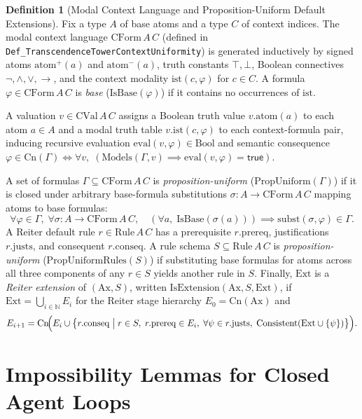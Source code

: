 \documentclass[11pt]{article}
\theoremstyle{plain}
\theoremstyle{definition}
\newtheorem{definition}[theorem]{Definition}
\theoremstyle{remark}
\newcommand{\ist}{\mathrm{ist}}
\newcommand{\Cn}{\mathrm{Cn}}
\newcommand{\eval}{\mathrm{eval}}
\newcommand{\Ax}{\mathrm{Ax}}
\newcommand{\Ext}{\mathrm{Ext}}
\newcommand{\CForm}{\mathrm{CForm}}
\newcommand{\CVal}{\mathrm{CVal}}
\newcommand{\Rule}{\mathrm{Rule}}
\newcommand{\IsBase}{\mathrm{IsBase}}
\newcommand{\PropUniform}{\mathrm{PropUniform}}
\newcommand{\PropUniformRules}{\mathrm{PropUniformRules}}
\newcommand{\IsExtension}{\mathrm{IsExtension}}
\newcommand{\Consistent}{\mathrm{Consistent}}
\newcommand{\Models}{\mathrm{Models}}
\begin{document}
\begin{definition}[Modal Context Language and Proposition-Uniform Default Extensions]
Fix a type $A$ of base atoms and a type $C$ of context indices. The modal
context language $\CForm\,A\,C$ (defined in
\texttt{Def\_TranscendenceTowerContextUniformity}) is generated inductively by
signed atoms $\mathrm{atom}^+(a)$ and $\mathrm{atom}^-(a)$, truth constants
$\top, \bot$, Boolean connectives $\neg, \wedge, \vee, \to$, and the context
modality $\ist(c, \varphi)$ for $c \in C$. A formula $\varphi \in \CForm\,A\,C$
is \emph{base} ($\IsBase(\varphi)$) if it contains no occurrences of $\ist$.

A valuation $v \in \CVal\,A\,C$ assigns a Boolean truth value $v.\mathrm{atom}(a)$
to each atom $a \in A$ and a modal truth table $v.\mathrm{ist}(c, \varphi)$ to
each context-formula pair, inducing recursive evaluation $\eval(v, \varphi) \in
\mathrm{Bool}$ and semantic consequence $\varphi \in \Cn(\Gamma) \iff
\forall v,\; (\Models(\Gamma, v) \implies \eval(v, \varphi) = \mathsf{true})$.

A set of formulas $\Gamma \subseteq \CForm\,A\,C$ is \emph{proposition-uniform}
($\PropUniform(\Gamma)$) if it is closed under arbitrary base-formula
substitutions $\sigma : A \to \CForm\,A\,C$ mapping atoms to base formulas:
\[
  \forall \varphi \in \Gamma,\;\forall \sigma : A \to \CForm\,A\,C,\quad
  (\forall a,\; \IsBase(\sigma(a))) \implies \mathrm{subst}(\sigma, \varphi) \in \Gamma.
\]
A Reiter default rule $r \in \Rule\,A\,C$ has a prerequisite $r.\mathrm{prereq}$,
justifications $r.\mathrm{justs}$, and consequent $r.\mathrm{conseq}$. A rule
schema $S \subseteq \Rule\,A\,C$ is \emph{proposition-uniform}
($\PropUniformRules(S)$) if substituting base formulas for atoms across all three
components of any $r \in S$ yields another rule in $S$. Finally, $\Ext$ is a
\emph{Reiter extension} of $(\Ax, S)$, written $\IsExtension(\Ax, S, \Ext)$, if
$\Ext = \bigcup_{i \in \mathbb{N}} E_i$ for the Reiter stage hierarchy
$E_0 = \Cn(\Ax)$ and
\[
  E_{i+1} = \Cn\!\Bigl(E_i \cup \bigl\{r.\mathrm{conseq} \;\big|\; r \in S,\;
  r.\mathrm{prereq} \in E_i,\; \forall \psi \in r.\mathrm{justs},\;
  \Consistent(\Ext \cup \{\psi\})\bigr\}\Bigr).
\]
\end{definition}

\section{Impossibility Lemmas for Closed Agent Loops}\label{sec:lemmas}
\end{document}
